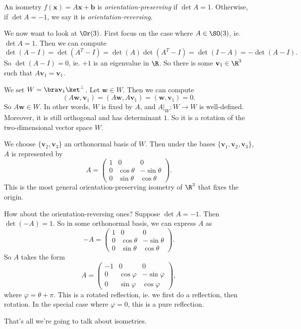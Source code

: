 \documentclass[a4paper]{article}
\begin{document}
\begin{defi}
  An isometry $f(\mathbf{x}) = A\mathbf{x} + \mathbf{b}$ is \emph{orientation-preserving} if $\det A = 1$. Otherwise, if $\det A = -1$, we say it is \emph{orientation-reversing}.
\end{defi}

\begin{eg}
  We now want to look at $\Or(3)$. First focus on the case where $A \in \SO(3)$, ie. $\det A = 1$. Then we can compute
  \[
    \det(A - I) = \det(A^T - I) = \det(A)\det(A^T - I) = \det(I - A) = -\det(A - I).
  \]
  So $\det (A - I) = 0$, ie. $+1$ is an eigenvalue in $\R$. So there is some $\mathbf{v}_1 \in \R^3$ such that $A\mathbf{v}_1 = \mathbf{v}_1$.

  We set $W = \bra \mathbf{v}_1\ket^{\perp}$. Let $\mathbf{w} \in W$. Then we can compute
  \[
    (A\mathbf{w}, \mathbf{v}_1) = (A\mathbf{w}, A\mathbf{v}_1) = (\mathbf{w}, \mathbf{v}_1) = 0.
  \]
  So $A\mathbf{w} \in W$. In other words, $W$ is fixed by $A$, and $A|_{W}: W \to W$ is well-defined. Moreover, it is still orthogonal and has determinant $1$. So it is a rotation of the two-dimensional vector space $W$.

  We choose $\{\mathbf{v}_2, \mathbf{v}_3\}$ an orthonormal basis of $W$. Then under the bases $\{\mathbf{v}_1, \mathbf{v}_2, \mathbf{v}_3\}$, $A$ is represented by
  \[
    A =
    \begin{pmatrix}
      1 & 0 & 0\\
      0 & \cos \theta & - \sin \theta\\
      0 & \sin \theta & \cos \theta
    \end{pmatrix}.
  \]
  This is the most general orientation-preserving isometry of $\R^3$ that fixes the origin.

  How about the orientation-reversing ones?
  Suppose $\det A = -1$. Then $\det(-A) = 1$. So in some orthonormal basis, we can express $A$ as
  \[
    -A =
    \begin{pmatrix}
      1 & 0 & 0\\
      0 & \cos \theta & - \sin \theta\\
      0 & \sin \theta & \cos \theta
    \end{pmatrix}.
  \]
  So $A$ takes the form
  \[
    A =
    \begin{pmatrix}
      -1 & 0 & 0\\
      0 & \cos \varphi & -\sin \varphi\\
      0 & \sin \varphi & \cos \varphi
    \end{pmatrix},
  \]
  where $\varphi = \theta + \pi$. This is a rotated reflection, ie. we first do a reflection, then rotation. In the special case where $\varphi = 0$, this is a pure reflection.
\end{eg}
That's all we're going to talk about isometries.
\end{document}
